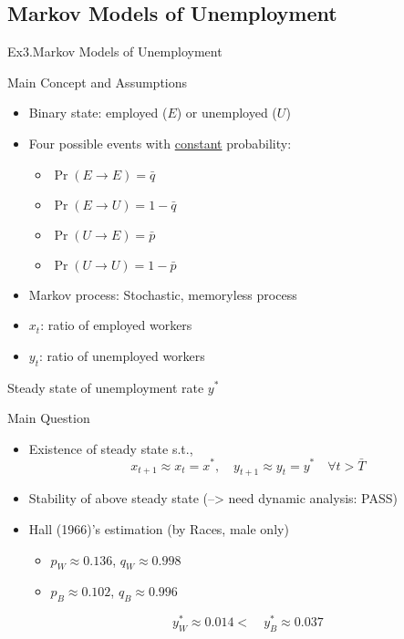\documentclass[final]{beamer}
\begin{document}
\subsection{Markov Models of Unemployment} %
\label{sub:markov_models_of_unemployment}
\begin{frame}[t]{Ex3.Markov Models of Unemployment}
	\begin{block}
		{Main Concept and Assumptions}
		\begin{itemize}
			\item Binary state: employed ($E$) or unemployed ($U$)
			\item Four possible events with \uline{constant} probability: 
			\begin{itemize}
				\item $\Pr(E\rightarrow E)=\bar q$
				\item $\Pr(E\rightarrow U)=1-\bar q$
				\item $\Pr(U\rightarrow E)=\bar p$
				\item $\Pr(U\rightarrow U)=1-\bar p$
			\end{itemize}
			\item Markov process: Stochastic, memoryless process
			\item $x_t$: ratio of employed workers
			\item $y_t$: ratio of unemployed workers
		\end{itemize}
	\end{block}
\end{frame}
\begin{frame}[t]{Steady state of unemployment rate $y^\ast$}
	\begin{block}
		{Main Question}
		\begin{itemize}
			\item Existence of steady state s.t., 
			\[
				x_{t+1} \approx x_t = x^\ast,\quad y_{t+1} \approx y_t=y^\ast \quad \forall t>\bar T
			\]
			\item Stability of above steady state (--> need dynamic analysis: PASS)
		\end{itemize}
	\end{block}
	\begin{itemize}
		\item Hall (1966)'s estimation (by Races, male only)
		\begin{itemize}
			\item $p_{W}\approx 0.136$, $q_{W}\approx 0.998$
			\item $p_{B}\approx 0.102$, $q_{B}\approx 0.996$
		\end{itemize}
		\[
			y_{W}^\ast \approx 0.014 < \quad y_{B}^\ast \approx 0.037
		\]
	\end{itemize}
\end{frame}
\end{document}
